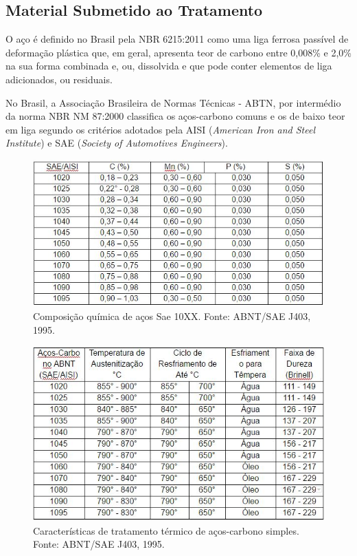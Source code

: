 \subsection{Material Submetido ao Tratamento}

O aço é definido no Brasil pela NBR 6215:2011 como uma liga ferrosa passível de deformação plástica que, em geral, apresenta teor de carbono entre 0,008\% e 2,0\% na sua forma combinada e, ou, dissolvida e que pode conter elementos de liga adicionados, ou residuais.

No Brasil, a Associação Brasileira de Normas Técnicas - ABTN, por intermédio da norma NBR NM 87:2000 classifica os aços-carbono comuns e os de baixo teor em liga segundo os critérios adotados pela AISI (\textit{American Iron and Steel Institute}) e SAE (\textit{Society of Automotives Engineers}).

\begin{figure}[!h]
	\centering
	\label{tab_sae1}
	\includegraphics[keepaspectratio=true,scale=0.8]{figuras/tab_sae1.JPG}
	\caption{Composição química de aços Sae 10XX\@. Fonte: ABNT/SAE J403, 1995.}
\end{figure}

\begin{figure}[!h]
	\centering
	\label{tab_sae2}
	\includegraphics[keepaspectratio=true,scale=0.8]{figuras/tab_sae2.JPG}
	\caption{Características de tratamento térmico de aços-carbono simples.  Fonte: ABNT/SAE J403, 1995.}
\end{figure}

